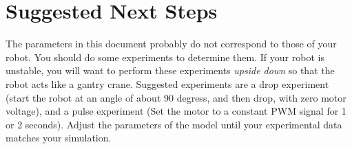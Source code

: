 \section{Suggested Next Steps}

The parameters in this document probably do not correspond to those of your robot. You should do some experiments to determine them. If your robot is unstable, you will want to perform these experiments {\em upside down} so that the robot acts like a gantry crane. Suggested experiments are a drop experiment (start the robot at an angle of about 90 degress, and then drop, with zero motor voltage), and a pulse experiment (Set the motor to a constant PWM signal for 1 or 2 seconds). Adjust the parameters of the model until your experimental data matches your simulation.

  
